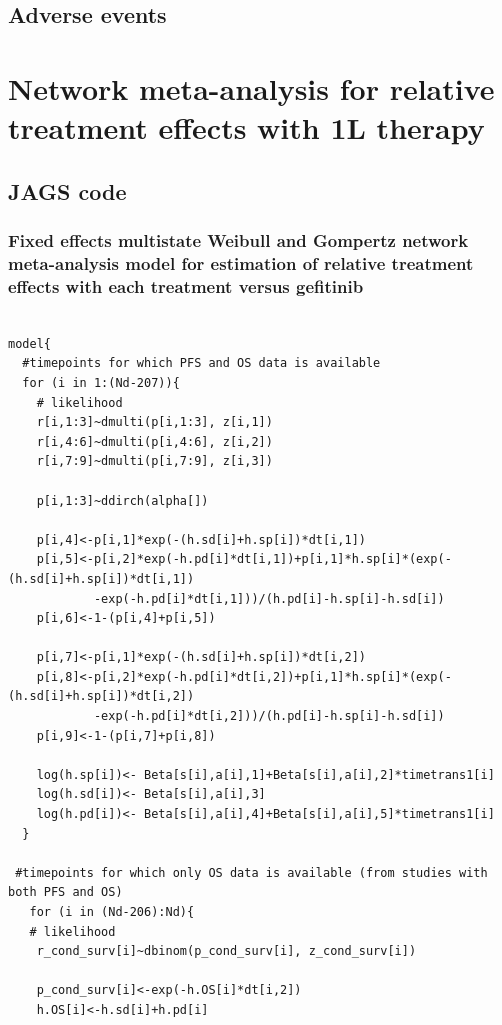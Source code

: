 \documentclass[11pt,final,fleqn]{article}\usepackage[]{graphicx}\usepackage[]{color}
\theoremstyle{plain}
\begin{document}
\begin{appendices}


\subsection{Adverse events}


\section{Network meta-analysis for relative treatment effects with 1L therapy}
\subsection{JAGS code}\label{sec:1l-nma-jags}

\subsubsection{Fixed effects multistate Weibull and Gompertz network meta-analysis model for estimation of relative treatment effects with each treatment versus gefitinib} 

\begin{verbatim} 

model{
  #timepoints for which PFS and OS data is available
  for (i in 1:(Nd-207)){
    # likelihood
    r[i,1:3]~dmulti(p[i,1:3], z[i,1]) 
    r[i,4:6]~dmulti(p[i,4:6], z[i,2]) 
    r[i,7:9]~dmulti(p[i,7:9], z[i,3]) 
    
    p[i,1:3]~ddirch(alpha[])
    
    p[i,4]<-p[i,1]*exp(-(h.sd[i]+h.sp[i])*dt[i,1])
    p[i,5]<-p[i,2]*exp(-h.pd[i]*dt[i,1])+p[i,1]*h.sp[i]*(exp(-(h.sd[i]+h.sp[i])*dt[i,1])
    		-exp(-h.pd[i]*dt[i,1]))/(h.pd[i]-h.sp[i]-h.sd[i])
    p[i,6]<-1-(p[i,4]+p[i,5])
    
    p[i,7]<-p[i,1]*exp(-(h.sd[i]+h.sp[i])*dt[i,2])
    p[i,8]<-p[i,2]*exp(-h.pd[i]*dt[i,2])+p[i,1]*h.sp[i]*(exp(-(h.sd[i]+h.sp[i])*dt[i,2])
    		-exp(-h.pd[i]*dt[i,2]))/(h.pd[i]-h.sp[i]-h.sd[i])
    p[i,9]<-1-(p[i,7]+p[i,8])
    
    log(h.sp[i])<- Beta[s[i],a[i],1]+Beta[s[i],a[i],2]*timetrans1[i] 
    log(h.sd[i])<- Beta[s[i],a[i],3] 
    log(h.pd[i])<- Beta[s[i],a[i],4]+Beta[s[i],a[i],5]*timetrans1[i]
  }
  
 #timepoints for which only OS data is available (from studies with both PFS and OS)
   for (i in (Nd-206):Nd){
   # likelihood
    r_cond_surv[i]~dbinom(p_cond_surv[i], z_cond_surv[i]) 
    
    p_cond_surv[i]<-exp(-h.OS[i]*dt[i,2])
    h.OS[i]<-h.sd[i]+h.pd[i]
    

\end{verbatim}
\end{appendices}
\end{document}
